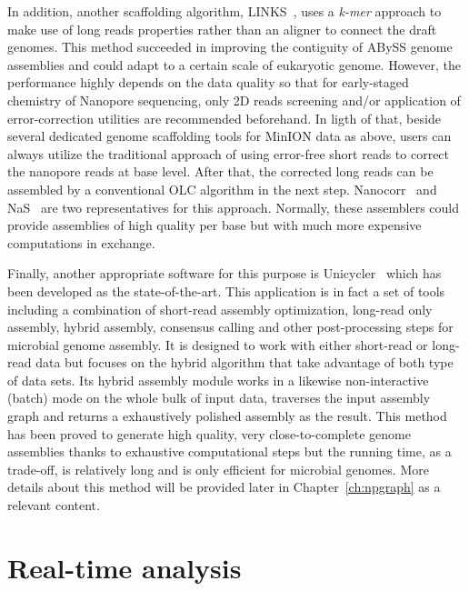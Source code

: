 In addition, another scaffolding algorithm, LINKS~\cite{WarrenYV2015}, uses a \emph{k-mer} approach to make use of long reads properties rather than an aligner to connect the draft genomes. This method  succeeded in improving the contiguity of ABySS genome
assemblies and could adapt to a certain scale of eukaryotic genome. However, the performance highly depends on the data quality so that for early-staged chemistry of Nanopore sequencing, only 2D reads screening and/or application of error-correction utilities are recommended beforehand.
In ligth of that, beside several dedicated genome scaffolding tools for MinION data as above, users can always utilize the traditional approach of using error-free short reads to correct the nanopore reads at base level. After that, the corrected long reads can be assembled by a conventional OLC algorithm in the next step. Nanocorr~\cite{GoodwinGE2015} and NaS~\cite{MadouiEC2015} are two representatives for this approach. Normally, these assemblers could provide assemblies of high quality per base but with much more expensive computations in exchange. 

Finally, another appropriate software for this purpose is Unicycler~\cite{Wick2017unicycler} which has been developed as the state-of-the-art. This application is in fact a set of tools including a combination of short-read assembly optimization, long-read only assembly, hybrid assembly, consensus calling and other post-processing steps for microbial genome assembly. It is designed to work with either short-read or long-read data but focuses on the hybrid algorithm that take advantage of both type of data sets. 
Its hybrid assembly module works in a likewise non-interactive (batch) mode on the whole bulk of input data, traverses the input assembly graph and returns a exhaustively polished assembly as the result. 
This method has been proved to generate high quality, very close-to-complete genome assemblies thanks to exhaustive computational steps but the running time, as a trade-off, is relatively long and is only efficient for microbial genomes. 
More details about this method will be provided later in Chapter~\ref{ch:npgraph} as a relevant content.
\section{Real-time analysis}

